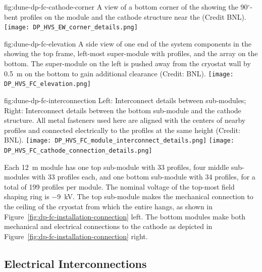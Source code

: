 \begin{dunefigure}{fig:dune-dp-fc-cathode-corner}
{A view of a bottom corner of the  showing the \num{90}$^{\circ}$-bent  profiles on the \endwall module and the cathode structure near the \endwall (Credit BNL).}
\texttt{[image: DP\_HVS\_EW\_corner\_details.png]}
\end{dunefigure}

\begin{dunefigure}{fig:dune-dp-fc-elevation}
{A side view of one end of the  system components in the  showing the top frame, left-most super-module with profiles, and the  array on the bottom.  The \endwall super-module on the left is pushed away from the cryostat wall by \SI{0.5}{\m} on the bottom to gain additional  clearance (Credit: BNL).}
\texttt{[image: DP\_HVS\_FC\_elevation.png]}
\end{dunefigure}


\begin{dunefigure}{fig:dune-dp-fc-interconnection}
{Left: Interconnect details between  sub-modules; Right: Interconnect details between the bottom  sub-module and the cathode structure. All metal fasteners used here are aligned with the centers of nearby  profiles and connected electrically to the  profiles at the same height (Credit: BNL). }
\texttt{[image: DP\_HVS\_FC\_module\_interconnect\_details.png]}
\texttt{[image: DP\_HVS\_FC\_cathode\_connection\_details.png]}
\end{dunefigure}


Each \SI{12}{\m} module has one top sub-module with \num{33} profiles, four middle sub-modules with \num{33} profiles each, and one bottom sub-module with \num{34} profiles, for a total of \num{199} profiles per module. 
The nominal voltage of the top-most field shaping ring is \SI{-9}{\kV}. 
The top sub-module makes the mechanical connection to the ceiling of the cryostat from which the entire  hangs, as shown in Figure~\ref{fig:dp-fc-installation-connection} left. The bottom modules make both mechanical and electrical connections to the cathode as depicted in Figure~\ref{fig:dp-fc-installation-connection} right.


\subsection{Electrical Interconnections}

